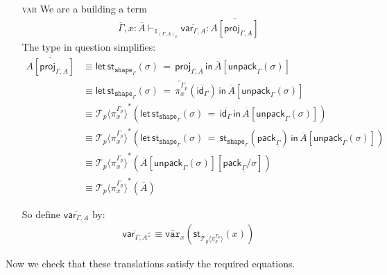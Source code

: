 \documentclass[10pt]{article}
\theoremstyle{definition}
\newcommand{\yields}{\vdash}
\newcommand{\id}{\mathsf{id}}
\newcommand{\rewrite}[2]{\overleftarrow{#1}(#2)}
\newcommand\St[2]{\ensuremath{{#1}^*(#2)}}
\newcommand\StI[2]{\ensuremath{\mathsf{st}_{#1}(#2)}}
\newcommand\StE[4]{\ensuremath{\mathsf{let} \, \StI{#1}{#3} \, = \, {#2} \, \mathsf{in} \, #4}}
\newcommand\ApEl[2]{\mathcal{T}_{#1}\langle#2\rangle}
\newcommand\pack[1]{\ensuremath{\mathsf{pack}_{#1}}}
\newcommand\unpack[2]{\ensuremath{\mathsf{unpack}_{#1}(#2)}}
\newcommand{\modeof}[1]{{#1}_p}
\newcommand{\tshape}[1]{\ensuremath{\mathtt{shape}_{#1}}}
\newcommand{\upstairs}[1]{\overline{#1}}
\newcommand{\downstairs}[1]{\underline{#1}}
\newcommand\proj[1]{\ensuremath{\mathsf{proj}_{#1}}}
\newcommand\qvar[1]{\ensuremath{\mathsf{var}_{#1}}}
\newcommand\One{\ensuremath{\mathds{1}}}
\newcommand\var[1]{\ensuremath{\mathtt{var}_{#1}}}
\begin{document}
\begin{enumerate}
\item[\textsc{var}] We are a building a term
\begin{align*}
\upstairs{\Gamma}, x : \upstairs{A} \yields_{\One_{\modeof{(\Gamma, A)}}} \upstairs{\qvar{\Gamma, A}} : \upstairs{A[\proj{\Gamma, A}]}
\end{align*}
The type in question simplifies:
\begin{align*}
\upstairs{A[\proj{\Gamma, A}]}
&\equiv \StE{\tshape{\Gamma}}{\upstairs{\proj{\Gamma, A}}}{\sigma}{\upstairs{A}[\unpack{\Gamma}{\sigma}]} \\
&\equiv \StE{\tshape{\Gamma}}{\rewrite{\pi^{\modeof{\Gamma}}_x}{\upstairs{\id_\Gamma}}}{\sigma}{\upstairs{A}[\unpack{\Gamma}{\sigma}]} \\
&\equiv \St{\ApEl{p}{\pi^{\modeof{\Gamma}}_x}}{\StE{\tshape{\Gamma}}{\upstairs{\id_\Gamma}}{\sigma}{\upstairs{A}[\unpack{\Gamma}{\sigma}]}} \\
&\equiv \St{\ApEl{p}{\pi^{\modeof{\Gamma}}_x}}{\StE{\tshape{\Gamma}}{\StI{\tshape{\Gamma}}{\pack{\downstairs{\Gamma}}}}{\sigma}{\upstairs{A}[\unpack{\Gamma}{\sigma}]}} \\
&\equiv \St{\ApEl{p}{\pi^{\modeof{\Gamma}}_x}}{\upstairs{A}[\unpack{\Gamma}{\sigma}][\pack{\downstairs{\Gamma}}/\sigma]} \\
&\equiv \St{\ApEl{p}{\pi^{\modeof{\Gamma}}_x}}{\upstairs{A}}
\end{align*}

So define $\upstairs{\qvar{\Gamma, A}}$ by:
\begin{align*}
\upstairs{\qvar{\Gamma, A}} :\equiv \rewrite{\var{x}}{\StI{\ApEl{p}{\pi^{\modeof{\Gamma}}_x}}{x}}
\end{align*}
\end{enumerate}

Now we check that these translations satisfy the required equations.
\end{document}
